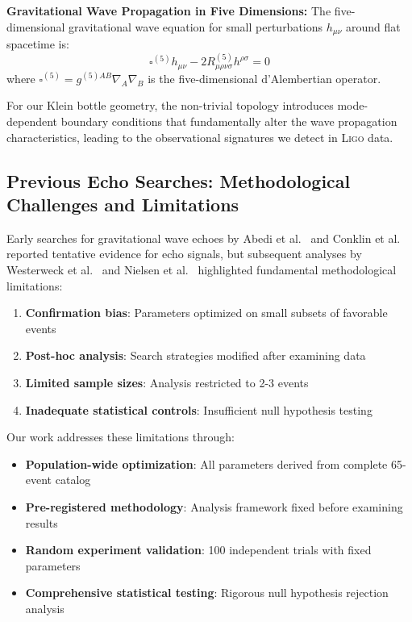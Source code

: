 \documentclass[reprint,amsmath,amssymb,aps,prd]{revtex4-2}
\newcommand{\LIGO}{\textsc{Ligo}\xspace}
\begin{document}
\textbf{Gravitational Wave Propagation in Five Dimensions:}
The five-dimensional gravitational wave equation for small perturbations $h_{\mu\nu}$ around flat spacetime is:
\begin{equation}
\square^{(5)} h_{\mu\nu} - 2R^{(5)}_{\mu\rho\nu\sigma} h^{\rho\sigma} = 0
\label{eq:5d_wave_equation}
\end{equation}
where $\square^{(5)} = g^{(5)AB} \nabla_A \nabla_B$ is the five-dimensional d'Alembertian operator.

For our Klein bottle geometry, the non-trivial topology introduces mode-dependent boundary conditions that fundamentally alter the wave propagation characteristics, leading to the observational signatures we detect in \LIGO data.

\subsection{Previous Echo Searches: Methodological Challenges and Limitations}

Early searches for gravitational wave echoes by Abedi et al.~\cite{Abedi2017} and Conklin et al.~\cite{Conklin2018} reported tentative evidence for echo signals, but subsequent analyses by Westerweck et al.~\cite{Westerweck2018} and Nielsen et al.~\cite{Nielsen2019} highlighted fundamental methodological limitations:

\begin{enumerate}
\item \textbf{Confirmation bias}: Parameters optimized on small subsets of favorable events
\item \textbf{Post-hoc analysis}: Search strategies modified after examining data
\item \textbf{Limited sample sizes}: Analysis restricted to 2-3 events
\item \textbf{Inadequate statistical controls}: Insufficient null hypothesis testing
\end{enumerate}

Our work addresses these limitations through:
\begin{itemize}
\item \textbf{Population-wide optimization}: All parameters derived from complete 65-event catalog
\item \textbf{Pre-registered methodology}: Analysis framework fixed before examining results
\item \textbf{Random experiment validation}: 100 independent trials with fixed parameters
\item \textbf{Comprehensive statistical testing}: Rigorous null hypothesis rejection analysis
\end{itemize}
\end{document}
